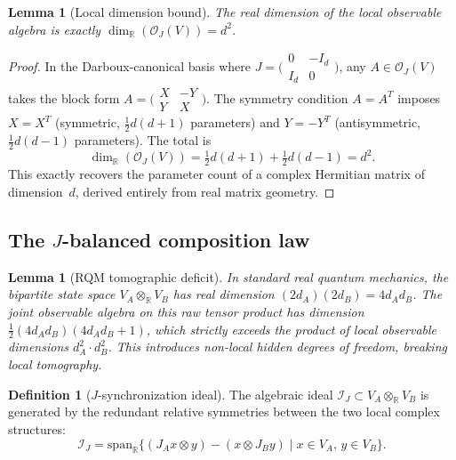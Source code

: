 \documentclass[aps,prd,twocolumn,superscriptaddress,nofootinbib]{revtex4-2}
\newtheorem{lemma}[theorem]{Lemma}
\theoremstyle{definition}
\newtheorem{definition}[theorem]{Definition}
\theoremstyle{remark}
\newcommand{\R}{\mathbb{R}}
\newcommand{\OJ}{\mathcal{O}_J}
\newcommand{\IdealJ}{\mathcal{I}_J}
\begin{document}
\begin{lemma}[Local dimension bound]
\label{lem:local_dim}
The real dimension of the local observable algebra is exactly
$\dim_\R(\OJ(V)) = d^2$.
\end{lemma}

\begin{proof}
In the Darboux-canonical basis where $J = \bigl(\begin{smallmatrix}
0 & -I_d \\ I_d & 0 \end{smallmatrix}\bigr)$, any $A \in \OJ(V)$ takes
the block form $A = \bigl(\begin{smallmatrix} X & -Y \\ Y & X
\end{smallmatrix}\bigr)$. The symmetry condition $A = A^T$ imposes
$X = X^T$ (symmetric, $\frac{1}{2}d(d+1)$ parameters) and
$Y = -Y^T$ (antisymmetric, $\frac{1}{2}d(d-1)$ parameters). The total is
\begin{equation}
\dim_\R(\OJ(V)) = \tfrac{1}{2}d(d+1) + \tfrac{1}{2}d(d-1) = d^2.
\end{equation}
This exactly recovers the parameter count of a complex Hermitian matrix
of dimension~$d$, derived entirely from real matrix geometry.
\end{proof}

\subsection{The $J$-balanced composition law}

\begin{lemma}[RQM tomographic deficit]
\label{lem:tomographic_deficit}
In standard real quantum mechanics, the bipartite state space
$V_A \otimes_\R V_B$ has real dimension $(2d_A)(2d_B) = 4d_A d_B$.
The joint observable algebra on this raw tensor product has dimension
$\frac{1}{2}(4d_A d_B)(4d_A d_B + 1)$, which strictly exceeds the product
of local observable dimensions $d_A^2 \cdot d_B^2$. This introduces
non-local hidden degrees of freedom, breaking local tomography.
\end{lemma}

\begin{definition}[$J$-synchronization ideal]
\label{def:sync_ideal}
The algebraic ideal $\IdealJ \subset V_A \otimes_\R V_B$ is generated by the
redundant relative symmetries between the two local complex structures:
\begin{equation}
\IdealJ = \mathrm{span}_\R \{ (J_A x \otimes y) - (x \otimes J_B y) \mid
x \in V_A,\, y \in V_B \}.
\label{eq:sync_ideal}
\end{equation}
\end{definition}
\end{document}
